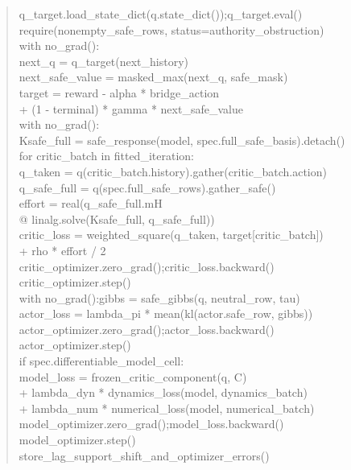 \documentclass[11pt]{article}
\numberwithin{section}{part}
\theoremstyle{plain}
\theoremstyle{definition}
\theoremstyle{remark}
\begin{document}
\begin{quote}
\small\ttfamily
q\_target.load\_state\_dict(q.state\_dict());\quad q\_target.eval()\\
require(nonempty\_safe\_rows, status=authority\_obstruction)\\
with no\_grad():\\
\quad next\_q = q\_target(next\_history)\\
\quad next\_safe\_value = masked\_max(next\_q, safe\_mask)\\
\quad target = reward - alpha * bridge\_action\\
\qquad\qquad + (1 - terminal) * gamma * next\_safe\_value\\
with no\_grad():\\
\quad Ksafe\_full = safe\_response(model, spec.full\_safe\_basis).detach()\\
for critic\_batch in fitted\_iteration:\\
\quad q\_taken = q(critic\_batch.history).gather(critic\_batch.action)\\
\quad q\_safe\_full = q(spec.full\_safe\_rows).gather\_safe()\\
\quad effort = real(q\_safe\_full.mH\\
\qquad\qquad @ linalg.solve(Ksafe\_full, q\_safe\_full))\\
\quad critic\_loss = weighted\_square(q\_taken, target[critic\_batch])\\
\qquad\qquad + rho * effort / 2\\
\quad critic\_optimizer.zero\_grad();\quad critic\_loss.backward()\\
\quad critic\_optimizer.step()\\
with no\_grad():\quad gibbs = safe\_gibbs(q, neutral\_row, tau)\\
actor\_loss = lambda\_pi * mean(kl(actor.safe\_row, gibbs))\\
actor\_optimizer.zero\_grad();\quad actor\_loss.backward()\\
actor\_optimizer.step()\\
if spec.differentiable\_model\_cell:\\
\quad model\_loss = frozen\_critic\_component(q, C)\\
\qquad\qquad + lambda\_dyn * dynamics\_loss(model, dynamics\_batch)\\
\qquad\qquad + lambda\_num * numerical\_loss(model, numerical\_batch)\\
\quad model\_optimizer.zero\_grad();\quad model\_loss.backward()\\
\quad model\_optimizer.step()\\
store\_lag\_support\_shift\_and\_optimizer\_errors()
\end{quote}
\end{document}
